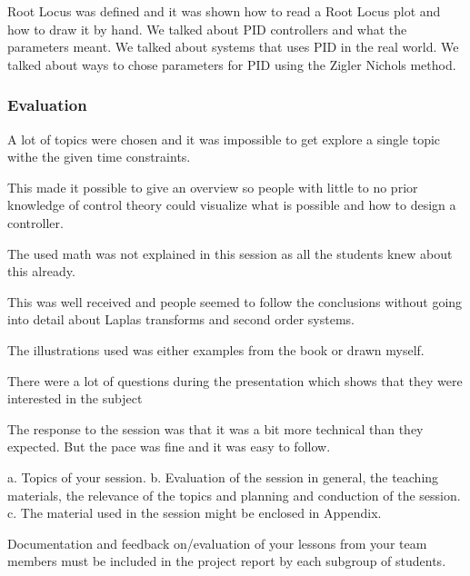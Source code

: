 Root Locus was defined and it was shown how to read a Root Locus plot and how to draw it by hand. 
We talked about PID controllers and what the parameters meant. 
We talked about systems that uses PID in the real world.
We talked about ways to chose parameters for PID using the Zigler Nichols method.

\subsubsection{Evaluation}
A lot of topics were chosen and it was impossible to get explore a single topic withe the given time constraints.

This made it possible to give an overview so people with little to no prior knowledge of control theory could visualize what is possible and how to design a controller.

The used math was not explained in this session as all the students knew about this already.

This was well received and people seemed to follow the conclusions without going into detail about Laplas transforms and second order systems.

The illustrations used was either examples from the book  or drawn myself.

There were a lot of questions during the presentation which shows that they were interested in the subject

The response to the session was that it was a bit more technical than they expected. 
But the pace was fine and it was easy to follow. 





a. Topics of your session. 
b. Evaluation of the session in general, the teaching materials, the relevance of the topics and planning and conduction of the session. 
c. The material used in the session might be enclosed in Appendix. 

Documentation and feedback on/evaluation of your lessons from your team
members must be included in the project report by each subgroup of
students. 